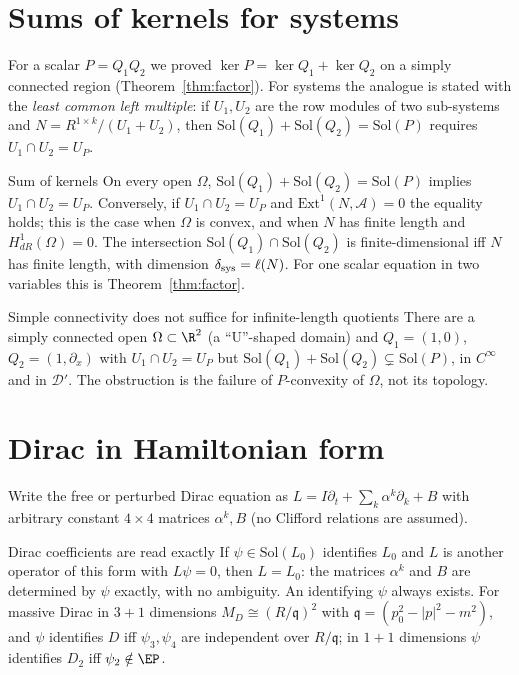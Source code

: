 \section{Sums of kernels for systems}

For a scalar $P=Q_1Q_2$ we proved $\ker P=\ker Q_1+\ker Q_2$ on a simply connected region (Theorem~\ref{thm:factor}). For systems the analogue is stated with the \emph{least common left multiple}: if $U_1,U_2$ are the row modules of two sub-systems and $N=R^{1\times k}/(U_1+U_2)$, then $\mathrm{Sol}(Q_1)+\mathrm{Sol}(Q_2)=\mathrm{Sol}(P)$ requires $U_1\cap U_2=U_P$.

\begin{theorem}{Sum of kernels  \proved}\label{thm:syss1}
On every open $\Omega$, $\mathrm{Sol}(Q_1)+\mathrm{Sol}(Q_2)=\mathrm{Sol}(P)$ implies $U_1\cap U_2=U_P$. Conversely, if $U_1\cap U_2=U_P$ and $\mathrm{Ext}^1(N,\mathcal A)=0$ the equality holds; this is the case when $\Omega$ is convex, and when $N$ has finite length and $H^1_{dR}(\Omega)=0$. The intersection $\mathrm{Sol}(Q_1)\cap\mathrm{Sol}(Q_2)$ is finite-dimensional iff $N$ has finite length, with dimension $\delta_{\rm sys}=\ell(N)$. For one scalar equation in two variables this is Theorem~\ref{thm:factor}.
\end{theorem}

\begin{falsebox}{Simple connectivity does not suffice for infinite-length quotients}{\falsest}\label{cex:syss1}
There are a simply connected open $\Omega\subset\R^2$ (a ``U''-shaped domain) and $Q_1=(1,0)$, $Q_2=(1,\partial_x)$ with $U_1\cap U_2=U_P$ but $\mathrm{Sol}(Q_1)+\mathrm{Sol}(Q_2)\subsetneq\mathrm{Sol}(P)$, in $C^\infty$ and in $\mathcal D'$. The obstruction is the failure of $P$-convexity of $\Omega$, not its topology.
\end{falsebox}

\section{Dirac in Hamiltonian form}

Write the free or perturbed Dirac equation as $L=I\partial_t+\sum_k\alpha^k\partial_k+B$ with arbitrary constant $4\times4$ matrices $\alpha^k,B$ (no Clifford relations are assumed).

\begin{theorem}{Dirac coefficients are read exactly  \proved}\label{thm:hdirac}
If $\psi\in\mathrm{Sol}(L_0)$ identifies $L_0$ and $L$ is another operator of this form with $L\psi=0$, then $L=L_0$: the matrices $\alpha^k$ and $B$ are determined by $\psi$ exactly, with no ambiguity. An identifying $\psi$ always exists. For massive Dirac in $3+1$ dimensions $M_D\cong(R/\mathfrak q)^{2}$ with $\mathfrak q=(p_0^2-|p|^2-m^2)$, and $\psi$ identifies $D$ iff $\psi_3,\psi_4$ are independent over $R/\mathfrak q$; in $1+1$ dimensions $\psi$ identifies $D_2$ iff $\psi_2\notin\EP$.
\end{theorem}

